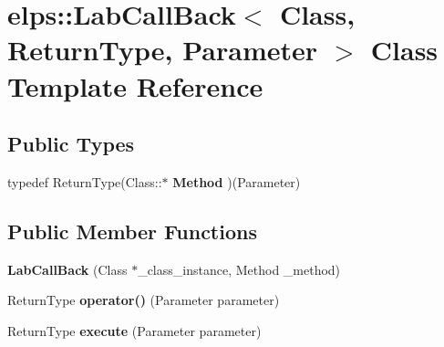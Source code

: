 \hypertarget{classelps_1_1_lab_call_back}{\section{elps\+:\+:Lab\+Call\+Back$<$ Class, Return\+Type, Parameter $>$ Class Template Reference}
\label{classelps_1_1_lab_call_back}
}
\subsection*{Public Types}
\begin{DoxyCompactItemize}
\item 
\hypertarget{classelps_1_1_lab_call_back_ad242ce58502562dbe4ff56021507f630}{typedef Return\+Type(Class\+::$\ast$ {\bfseries Method} )(Parameter)}\label{classelps_1_1_lab_call_back_ad242ce58502562dbe4ff56021507f630}

\end{DoxyCompactItemize}
\subsection*{Public Member Functions}
\begin{DoxyCompactItemize}
\item 
\hypertarget{classelps_1_1_lab_call_back_acf9d14867365259a0c967b6c7609cc68}{{\bfseries Lab\+Call\+Back} (Class $\ast$\+\_\+class\+\_\+instance, Method \+\_\+method)}\label{classelps_1_1_lab_call_back_acf9d14867365259a0c967b6c7609cc68}

\item 
\hypertarget{classelps_1_1_lab_call_back_af3a0b5a5209e7cae39642e4f5220f4ac}{Return\+Type {\bfseries operator()} (Parameter parameter)}\label{classelps_1_1_lab_call_back_af3a0b5a5209e7cae39642e4f5220f4ac}

\item 
\hypertarget{classelps_1_1_lab_call_back_a24120f99a81b6ea6554a0c9bf7921cb3}{Return\+Type {\bfseries execute} (Parameter parameter)}\label{classelps_1_1_lab_call_back_a24120f99a81b6ea6554a0c9bf7921cb3}

\end{DoxyCompactItemize}
